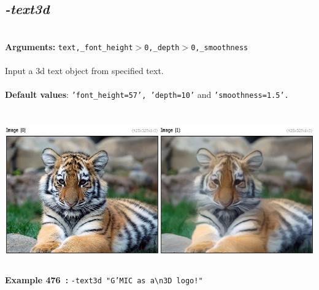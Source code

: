 \documentclass[a4paper,11pt,twoside]{book}
\begin{document}
\subsection{\emph{-text3d} }\vspace*{-0.5em}
~\\\textbf{Arguments: } 
{\small \texttt{text,\_font\_height$>$0,\_depth$>$0,\_smoothness}}\\~\\
Input a 3d text object from specified text.
~\\~\\\textbf{Default values}: {\small \texttt{'font\_height=57', 'depth=10'} and \texttt{'smoothness=1.5'.}}
\begin{center}\includegraphics[keepaspectratio=true,height=7cm,width=\textwidth]{img/gmic_def476.jpg}\\
{\footnotesize \textbf{Example 476~:} \texttt{-text3d "G'MIC as a\textbackslash n3D logo!"}}
\end{center}
\end{document}
